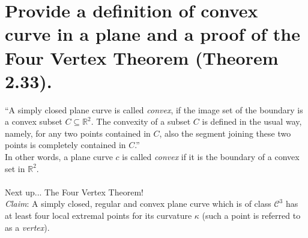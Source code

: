 \documentclass[12pt]{amsart}
\begin{document}
\newpage
\section{Provide a definition of convex curve in a plane and a proof of the Four Vertex Theorem (Theorem 2.33).}
``A simply closed plane curve is called \textit{convex}, if the image set of the boundary is a convex subset $C\subseteq\mathbb{R}^2$. The convexity of a subset $C$ is defined in the usual way, namely, for any two points contained in $C$, also the segment joining these two points is completely contained in $C$.''
\\In other words, a plane curve $c$ is called \textit{convex} if it is the boundary of a convex set in $\mathbb{R}^2$.
\\
\\Next up... The Four Vertex Theorem!
\\\textit{Claim}: A simply closed, regular and convex plane curve which is of class $\mathcal{C}^3$ has at least four local extremal points for its curvature $\kappa$ (such a point is referred to as a \textit{vertex}).
\end{document}
